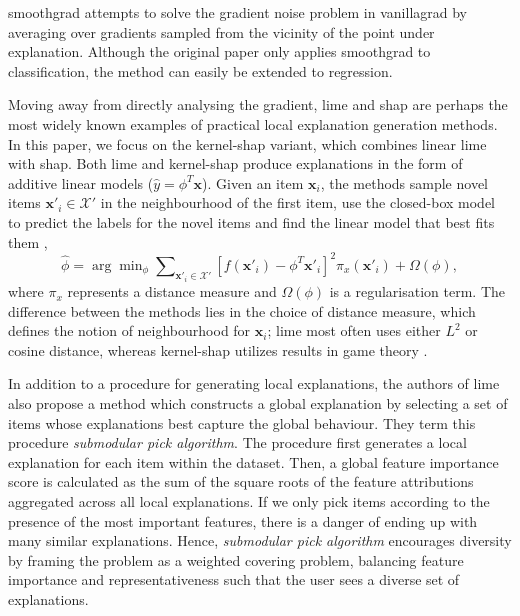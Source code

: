 {\sc smoothgrad} \cite{smilkov2017smoothgrad} attempts to solve the gradient noise problem in {\sc vanillagrad} by averaging over gradients sampled from the vicinity of the point under explanation.
Although the original paper only applies {\sc smoothgrad} to classification, the method can easily be extended to regression. 

Moving away from directly analysing the gradient, {\sc lime} \cite{ribeiro2016} and {\sc shap} \cite{lundberg2017unified} are perhaps the most widely known examples of practical local explanation generation methods.
In this paper, we focus on the {\sc kernel-shap} variant, which combines linear {\sc lime} with {\sc shap}.
Both {\sc lime} and {\sc kernel-shap} produce explanations in the form of additive linear models ($\hat{y} = \phi^T \bm{x}$).
Given an item $\bm{x}_i$, the methods sample novel items $\bm{x}'_i \in \mathcal{X}'$ in the neighbourhood of the first item, use the closed-box model to predict the labels for the novel items and find the linear model that best fits them \cite{lundberg2017unified},
\begin{equation}
    \hat{\phi} = \arg \min\nolimits_{\phi} \sum\nolimits_{\bm{x}'_i \in \mathcal{X}'} [f(\bm{x}'_i) - \phi^T \bm{x}'_i]^2 \pi_x(\bm{x}'_i) + \Omega(\phi),
\end{equation}
where $\pi_x$ represents a distance measure and $\Omega(\phi)$ is a regularisation term.
The difference between the methods lies in the choice of distance measure, which defines the notion of neighbourhood for $\bm{x}_i$; {\sc lime} most often uses either $L^2$ or cosine distance, whereas {\sc kernel-shap} utilizes results in game theory \cite{slack2021reliable}.

In addition to a procedure for generating local explanations, the authors of {\sc lime} also propose a method which constructs a global explanation by selecting a set of items whose explanations best capture the global behaviour.
They term this procedure \emph{submodular pick algorithm}.
The procedure first generates a local explanation for each item within the dataset. 
Then, a global feature importance score is calculated as the sum of the square roots of the feature attributions aggregated across all local explanations.
If we only pick items according to the presence of the most important features, there is a danger of ending up with many similar explanations.
Hence, \emph{submodular pick algorithm} encourages diversity by framing the problem as a weighted covering problem, balancing feature importance and representativeness such that the user sees a diverse set of explanations.

